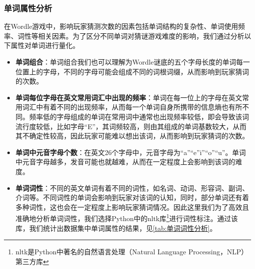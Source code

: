 \documentclass{MathModeling}
\begin{document}
	\subsubsection{单词属性分析}
	在Wordle游戏中，影响玩家猜测次数的因素包括单词结构的复杂性、单词使用频率、词性等相关因素。为了区分不同单词对猜谜游戏难度的影响，我们通过分析以下属性对单词进行量化。
\begin{itemize}
	\item \textbf{单词组合}：单词组合我们也可以理解为Wordle谜底的五个字母长度的单词每一位置上的字母，不同的字母可能会组成不同的词根词缀，从而影响到玩家猜词的次数。
	\item \textbf{单词每位字母在英文常用词汇中出现的频率}：单词在每一位上的字母在英文常用词汇中有着不同的出现频率，从而每一个单词自身所携带的信息熵也有所不同。频率低的字母组成的单词在常用词中通常也出现频率较低，即会导致该词流行度较低，比如字母“E”，其词频较高，则由其组成的单词基数较大，从而其不确定性较高，因此玩家可能难以想出该词，从而影响到玩家猜词的次数。
	\item \textbf{单词中元音字母个数}：在英文26个字母中，元音字母为“a”“e”i”“o”“u”。单词中元音字母越多，发音可能也就越难，从而在一定程度上会影响到该词的难度。
	\item \textbf{单词词性}：不同的英文单词有着不同的词性，如名词、动词、形容词、副词、介词等。不同词性的单词会影响到玩家对该词的认知，同时，部分单词还有着多种词性，这也会在一定程度上影响玩家猜词情况。因此这里我们为了高效且准确地分析单词词性，我们选择Python中的nltk库\textcolor{blue}{\footnote{nltk是Python中著名的自然语言处理（Natural Language Processing，NLP）第三方库}}进行词性标注。通过该库，我们统计出数据集中单词属性的结果，见\textcolor{blue}{\cref{tab:单词词性分析}}。
\begin{table}[H]
	\centering
	\caption{单词词性分析}
\end{table}
\end{itemize}
\end{document}
